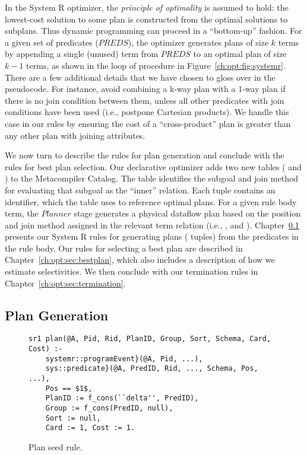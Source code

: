 In the System R optimizer, the {\em principle of optimality} is assumed to
hold: the lowest-cost solution to some plan is constructed from the optimal
solutions to subplans.  Thus dynamic programming can proceed in a ``bottom-up''
fashion.  For a given set of predicates ($PREDS$), the optimizer generates
plans of size $k$ terms by appending a single (unused) term from $PREDS$ to an
optimal plan of size $k-1$ terms, as shown in the loop of  procedure
in Figure~\ref{ch:opt:fig:systemr}.  There are a few additional details that we
have chosen to gloss over in the pseudocode.  For instance, avoid combining a
k-way plan with a 1-way plan if there is no join condition between them, unless
all other predicates with join conditions have been used (i.e., postpone
Cartesian products).  We handle this case in our \OVERLOG rules by ensuring the
cost of a ``cross-product'' plan is greater than any other plan with joining
attributes.  

We now turn to describe the \OVERLOG rules for plan generation and conclude
with the rules for best plan selection.  Our declarative optimizer adds two new
tables ( and ) to the Metacompiler Catalog.  The
 table identifies the subgoal and join method for evaluating that
subgoal as the ``inner'' relation.  Each  tuple contains an
identifier, which the  table uses to reference optimal plans.  For
a given rule body term, the $Planner$ stage generates a physical dataflow plan
based on the position and join method assigned in the relevant term relation
(i.e., ,  and ).
Chapter~\ref{ch:opt:sec:plangen} presents our System R rules for generating
plans ( tuples) from the predicates in the rule body.  Our rules for
selecting a best plan are described in Chapter~\ref{ch:opt:sec:bestplan}, which
also includes a description of how we estimate selectivities.  We then conclude
with our termination rules in Chapter~\ref{ch:opt:sec:termination}.

\subsection{Plan Generation}
\label{ch:opt:sec:plangen}

\begin{figure*}
\ssp
\centering
\begin{lstlisting}
sr1 plan(@A, Pid, Rid, PlanID, Group, Sort, Schema, Card, Cost) :-
    systemr::programEvent}(@A, Pid, ...),
    sys::predicate}(@A, PredID, Rid, ..., Schema, Pos, ...),
    Pos == $1$,
    PlanID := f_cons(``delta'', PredID),
    Group := f_cons(PredID, null),
    Sort := null,
    Card := 1, Cost := 1.
\end{lstlisting}
\caption{\label{ch:opt:fig:planseed}Plan seed rule.}
\end{figure*}

